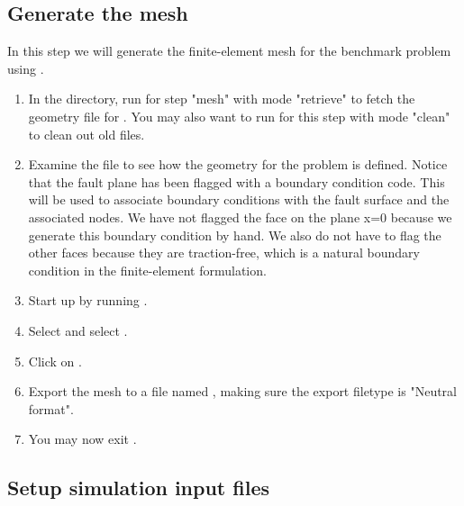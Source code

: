 \subsection{Generate the mesh}

In this step we will generate the finite-element mesh for the
benchmark problem using .

\begin{enumerate}
\item In the  directory, run
   for step "mesh" with mode "retrieve" to fetch the
  geometry file for . You may also want to run
   for this step with mode "clean" to clean out old
  files.

  \begin{screen}
    \shellprompt{}
    \shellprompt{}
  \end{screen}
  
\item Examine the  file to see how the
  geometry for the problem is defined. Notice that the fault plane has
  been flagged with a boundary condition code. This will be used to
  associate boundary conditions with the fault surface and the
  associated nodes. We have not flagged the face on the plane x=0
  because we generate this boundary condition by hand. We also do not
  have to flag the other faces because they are traction-free, which
  is a natural boundary condition in the finite-element formulation.
\item Start up  by running .

  \begin{screen}
    \shellprompt{}
  \end{screen}
  
\item Select \guiselect{}
  and select .
\item Click on .
\item Export the mesh to a file named ,
  making sure the export filetype is "Neutral format".
\item You may now exit .
\end{enumerate}

\subsection{Setup simulation input files}

